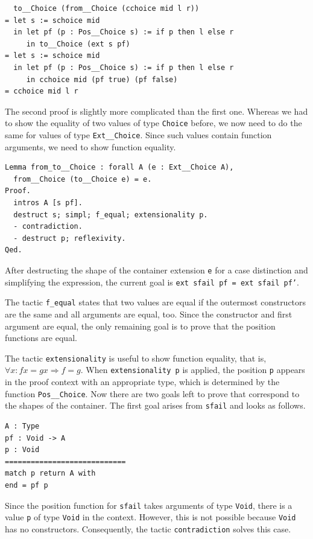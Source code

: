 \documentclass[a4paper, 11pt, fleqn, twoside, abstract=on]{scrreprt}
\newcommand{\cinl}[1]{\texttt{#1}}
\begin{document}
\begin{verbatim}
  to__Choice (from__Choice (cchoice mid l r))
= let s := schoice mid
  in let pf (p : Pos__Choice s) := if p then l else r
     in to__Choice (ext s pf)
= let s := schoice mid
  in let pf (p : Pos__Choice s) := if p then l else r
     in cchoice mid (pf true) (pf false)
= cchoice mid l r
\end{verbatim}

The second proof is slightly more complicated than the first one.
Whereas we had to show the equality of two values of type \cinl{Choice} before, we now need to do the same for values of type \cinl{Ext__Choice}.
Since such values contain function arguments, we need to show function equality.

\begin{verbatim}
Lemma from_to__Choice : forall A (e : Ext__Choice A),
  from__Choice (to__Choice e) = e.
Proof.
  intros A [s pf].
  destruct s; simpl; f_equal; extensionality p.
  - contradiction.
  - destruct p; reflexivity.
Qed. 
\end{verbatim}
\noindent
After destructing the shape of the container extension \cinl{e} for a case distinction and simplifying the expression, the current goal is \cinl{ext sfail pf = ext sfail pf'}.

The tactic \cinl{f_equal} states that two values are equal if the outermost constructors are the same and all arguments are equal, too.
Since the constructor and first argument are equal, the only remaining goal is to prove that the position functions are equal.

The tactic \cinl{extensionality} is useful to show function equality, that is, $\forall x: f x = g x \Rightarrow f = g$.
When \cinl{extensionality p} is applied, the position \cinl{p} appears in the proof context with an appropriate type, which is determined by the function \cinl{Pos__Choice}.
Now there are two goals left to prove that correspond to the shapes of the container.
The first goal arises from \cinl{sfail} and looks as follows.

\begin{verbatim}
A : Type
pf : Void -> A
p : Void
============================
match p return A with
end = pf p
\end{verbatim}
\noindent
Since the position function for \cinl{sfail} takes arguments of type \cinl{Void}, there is a value \cinl{p} of type \cinl{Void} in the context.
However, this is not possible because \cinl{Void} has no constructors.
Consequently, the tactic \cinl{contradiction} solves this case.
\end{document}
